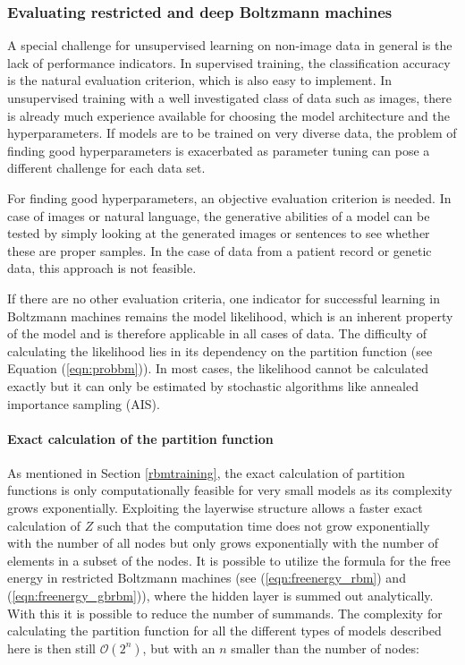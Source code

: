\documentclass[12pt]{article}
\begin{document}
\subsubsection{Evaluating restricted and deep Boltzmann machines}
A special challenge for unsupervised learning on non-image data in general is the lack of performance indicators.
In supervised training, the classification accuracy is the natural evaluation criterion, which is also easy to implement.
In unsupervised training with a well investigated class of data such as images, there is already much experience available for choosing the model architecture and the hyperparameters. If models are to be trained on very diverse data, the problem of finding good hyperparameters is exacerbated as parameter tuning can pose a different challenge for each data set.

For finding good hyperparameters, an objective evaluation criterion is needed.
In case of images or natural language, the generative abilities of a model can be tested by simply looking at the generated images or sentences to see whether these are proper samples. In the case of data from a patient record or genetic data, this approach is not feasible.

If there are no other evaluation criteria, one indicator for successful learning in Boltzmann machines remains the model likelihood, which is an inherent property of the model and is therefore applicable in all cases of data. The difficulty of calculating the likelihood lies in its dependency on the partition function (see Equation (\ref{eqn:probbm})).
In most cases, the likelihood cannot be calculated exactly but it can only be estimated by stochastic algorithms like annealed importance sampling (AIS).

\paragraph{Exact calculation of the partition function}
\label{methodExactloglik}
As mentioned in Section \ref{rbmtraining}, the exact calculation of partition functions is only computationally feasible for very small models as its complexity grows exponentially. Exploiting the layerwise structure allows a faster exact calculation of $Z$ such that the computation time does not grow exponentially with the number of all nodes but only grows exponentially with the number of elements in a subset of the nodes. It is possible to utilize the formula for the free energy in restricted Boltzmann machines (see (\ref{eqn:freenergy_rbm}) and (\ref{eqn:freenergy_gbrbm})), where the hidden layer is summed out analytically.
With this it is possible to reduce the number of summands.
The complexity for calculating the partition function for all the different types of  models described here is then still $\mathcal{O}(2^n)$, but with an $n$ smaller than the number of nodes:
\end{document}
